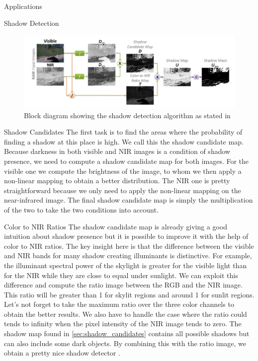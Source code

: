 \documentclass[10pt]{article}
\begin{document}
\begin{section}{Applications}
\begin{subsection}{Shadow Detection}
        \begin{figure}[!h]
            \begin{center}
                \includegraphics[width=\textwidth]{fig/shadow_detection_algorithm.jpg}
                \caption{Block diagram showing the shadow detection algorithm as stated in \cite{shadow}}
                \label{fig:shadow_detection_algorithm}
            \end{center}
        \end{figure}

        \begin{subsubsection}{Shadow Candidates}
            \label{sec:shadow_candidates}
            The first task is to find the areas where the probability of finding a shadow at this place is high. We call this the shadow candidate map. Because darkness in both visible and NIR images is a condition of shadow presence, we need to compute a shadow candidate map for both images. For the visible one we compute the brightness of the image, to whom we then apply a non-linear mapping to obtain a better distribution. The NIR one is pretty straightforward because we only need to apply the non-linear mapping on the near-infrared image. The final shadow candidate map is simply the multiplication of the two to take the two conditions into account.
        \end{subsubsection}

        \begin{subsubsection}{Color to NIR Ratios}
            \label{sec:color2NIR_ratios}
            The shadow candidate map is already giving a good intuition about shadow presence but it is possible to improve it with the help of color to NIR ratios. The key insight here is that the difference between the visible and NIR bands for many shadow creating illuminants is distinctive. For example, the illuminant spectral power of the skylight is greater for the visible light than for the NIR while they are close to equal under sunlight. We can exploit this difference and compute the ratio image between the RGB and the NIR image. This ratio will be greater than 1 for skylit regions and around 1 for sunlit regions. Let's not forget to take the maximum ratio over the three color channels to obtain the better results. We also have to handle the case where the ratio could tends to infinity when the pixel intensity of the NIR image tends to zero. The shadow map found in \ref{sec:shadow_candidates} contains all possible shadows but can also include some dark objects. By combining this with the ratio image, we obtain a pretty nice shadow detector .
        \end{subsubsection}


\end{subsection}
\end{section}
\end{document}
